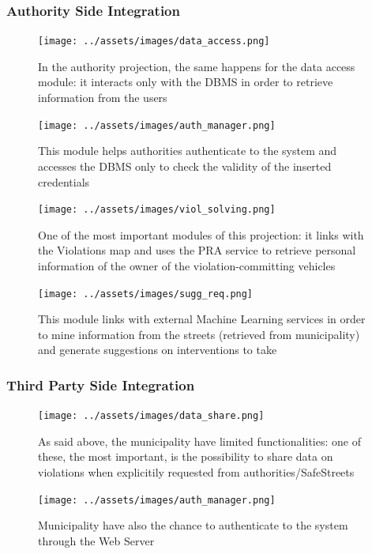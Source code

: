 \documentclass[12pt,a4paper]{article}
\begin{document}
\subsubsection{Authority Side Integration}
\begin{figure}[H]
		\centering
		\texttt{[image: ../assets/images/data\_access.png]}
		\caption{In the authority projection, the same happens for the data access module: it interacts only with the DBMS in order to retrieve information from the users}
\end{figure}
\begin{figure}[H]
		\centering
		\texttt{[image: ../assets/images/auth\_manager.png]}
		\caption{This module helps authorities authenticate to the system and accesses the DBMS only to check the validity of the inserted credentials}
\end{figure}
\begin{figure}[H]
		\centering
		\texttt{[image: ../assets/images/viol\_solving.png]}
		\caption{One of the most important modules of this projection: it links with the Violations map and uses the PRA service to retrieve personal information of the owner of the violation-committing vehicles}
\end{figure}
\begin{figure}[H]
		\centering
		\texttt{[image: ../assets/images/sugg\_req.png]}
		\caption{This module links with external Machine Learning services in order to mine information from the streets (retrieved from municipality) and generate suggestions on interventions to take}
\end{figure}
\subsubsection{Third Party Side Integration}
\begin{figure}[H]
		\centering
		\texttt{[image: ../assets/images/data\_share.png]}
		\caption{As said above, the municipality have limited functionalities: one of these, the most important, is the possibility to share data on violations when explicitily requested from authorities/SafeStreets}
\end{figure}
\begin{figure}[H]
		\centering
		\texttt{[image: ../assets/images/auth\_manager.png]}
		\caption{Municipality have also the chance to authenticate to the system through the Web Server}
\end{figure}
\end{document}
